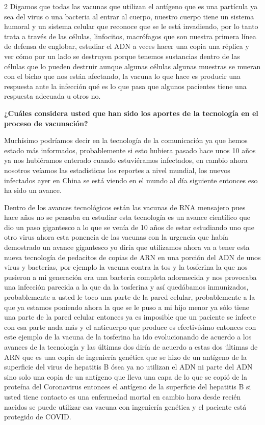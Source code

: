 \documentclass[12pt,spanish,Letterpaper,openany]{book}
\begin{document}
\begin {multicols}{2}
Digamos que todas las vacunas que utilizan el antígeno que es una partícula ya sea del virus
o una bacteria al entrar al cuerpo, nuestro cuerpo tiene un sistema humoral y un sistema
celular que reconoce que se le está invadiendo, por lo tanto trata a través de las células,
linfocitos, macrófagos que son nuestra primera línea de defensa de englobar, estudiar el ADN
a veces hacer una copia una réplica y ver cómo por un lado se destruyen porque tenemos
sustancias dentro de las células que lo pueden destruir aunque algunas células algunas
muestras se mueran con el bicho que nos están afectando, la vacuna lo que hace es producir
una respuesta ante la infección qué es lo que pasa que algunos pacientes tiene una respuesta
adecuada u otros no.

\textbf{¿Cuáles considera usted que han sido los aportes de la tecnología en el proceso de vacunación?}

Muchísimo podríamos decir en la tecnología de la comunicación ya que hemos estado más
informados, probablemente si esto hubiera pasado hace unos 10 años ya nos hubiéramos
enterado cuando estuviéramos infectados, en cambio ahora nosotros veíamos las estadísticas
los reportes a nivel mundial, los nuevos infectados ayer en China se está viendo en el mundo
al día siguiente entonces eso ha sido un avance.

Dentro de los avances tecnológicos están las vacunas de RNA mensajero pues hace años no
se pensaba en estudiar esta tecnología es un avance científico que dio un paso gigantesco a
lo que se venía de 10 años de estar estudiando uno que otro virus ahora esta ponencia de las
vacunas con la urgencia que había demostrado un avance gigantesco yo diría que utilizamos
ahora va a tener esta nueva tecnología de pedacitos de copias de ARN en una porción del
ADN de unos virus y bacterias, por ejemplo la vacuna contra la tos y la tosferina la que nos
pusieron a mi generación era una bacteria completa adormecida y nos provocaba una
infección parecida a la que da la tosferina y así quedábamos inmunizados, probablemente a
usted le toco una parte de la pared celular, probablemente a la que ya estamos poniendo ahora
la que se le puso a mi hijo menor ya sólo tiene una parte de la pared celular entonces ya es
imposible que un paciente se infecte con esa parte nada más y el anticuerpo que produce es
efectivísimo entonces con este ejemplo de la vacuna de la tosferina ha ido evolucionando de
acuerdo a los avances de la tecnología y las últimas dos diría de acuerdo a estas dos últimas
de ARN que es una copia de ingeniería genética que se hizo de un antígeno de la superficie
del virus de hepatitis B ósea ya no utilizan el ADN ni parte del ADN sino solo una copia de
un antígeno que lleva una capa de lo que se copió de la proteína del Coronavirus entonces el
antígeno de la superficie del hepatitis B si usted tiene contacto es una enfermedad mortal en
cambio hora desde recién nacidos se puede utilizar esa vacuna con ingeniería genética y el
paciente está protegido de COVID.


\end{multicols}
\end{document}
